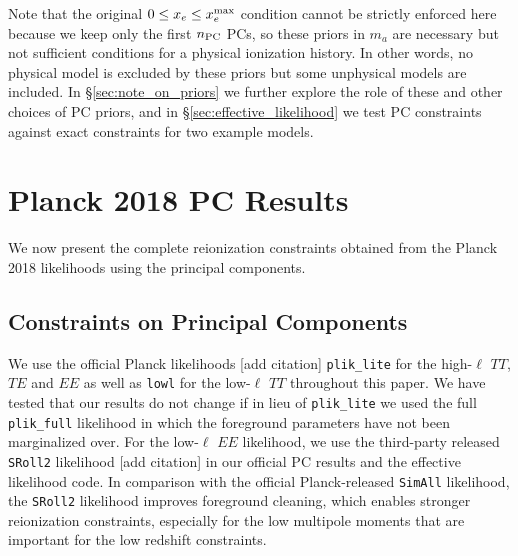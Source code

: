 \documentclass[prd,twocolumn,amsmath,amssymb,floatfix,superscriptaddress,nofootinbib]{revtex4-1}
\begin{document}
%
Note that the original $0\le x_e \le x_e^{\rm max}$ condition cannot be strictly enforced here because we  keep only the first $n_{\rm PC}$ PCs, so these priors in $m_a$ are necessary but not sufficient conditions for a physical ionization history.  
In other words, no physical model is excluded by these priors but some unphysical models are included.  In \S \ref{sec:note_on_priors} we further explore the role of these and other choices of PC priors, and in \S\ref{sec:effective_likelihood} we test PC constraints against exact constraints for two example models.  



\section{Planck 2018 PC Results}
\label{sec:results}
We now present the complete reionization constraints obtained from the Planck 2018 likelihoods using the principal components.
\subsection{Constraints on Principal Components}
We use the official Planck likelihoods [add citation] \texttt{plik\_lite} for the high-$\ell$ $TT$, $TE$ and $EE$ as well as \texttt{lowl} for the low-$\ell$ $TT$ throughout this paper. We have tested that our results do not change if in lieu of \texttt{plik\_lite} we used the full \texttt{plik\_full} likelihood in which the foreground parameters have not been marginalized over. For the low-$\ell$ $EE$ likelihood, we use the third-party released \texttt{SRoll2} likelihood [add citation] in our official PC results and the effective likelihood code. In comparison with the official Planck-released \texttt{SimAll} likelihood, the \texttt{SRoll2} likelihood improves foreground cleaning, 
which enables stronger reionization constraints, especially for the low multipole moments that are important for the low redshift constraints.

\end{document}
